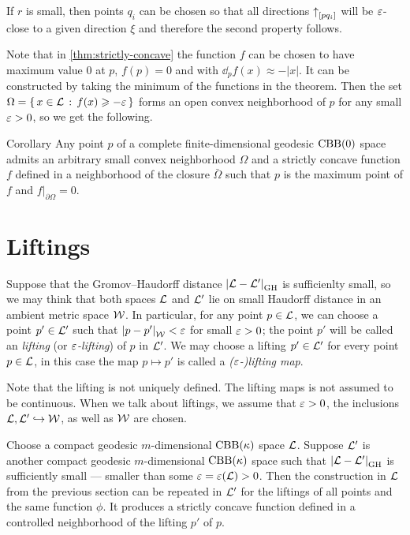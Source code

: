 If $r$ is small, then points $q_i$ can be chosen so that all directions
${\uparrow}_{[{p}{q_i}]}$ will be $\varepsilon$-close to a given direction $\xi$ and
therefore the second property follows.
\qeds

Note that in \ref{thm:strictly-concave} the function $f$ can be chosen to have maximum value $0$ at $p$,
$f(p)=0$ and with $\dd_p f(x)\approx-|x|$.
It can be constructed by taking the minimum of the functions in the theorem.
Then the set $\Omega=\left\{\,{x\in\mathcal{L}}\,:\,{f(x)\geqslant -\varepsilon}\,\right\}$ forms an open convex neighborhood of $p$ for any small $\varepsilon>0$, so we get the following.


\begin{thm}{Corollary}\label{cor:convex-nbhd}
Any point $p$ of a complete finite-dimensional geodesic $\mathrm{CBB}(0)$ space admits an arbitrary small convex neighborhood $\Omega$ and a strictly concave function $f$ defined in a neighborhood of the closure $\bar\Omega$ such that $p$ is the maximum point of $f$
and $f|_{\partial\Omega}=0$.
\end{thm}

\section{Liftings}

Suppose that the Gromov--Haudorff distance $\dist{\spc{L}}{\spc{L}'}{\GH}$ is sufficienlty small, so we may think that both spaces $\mathcal{L}$ and $\mathcal{L}'$ lie on small Haudorff distance in an ambient metric space $\mathcal{W}$.
In particular, for any point $p\in \mathcal{L}$, we can choose a point $p'\in \mathcal{L}'$ such that $\dist{p}{p'}{\spc{W}}<\eps$ for small $\varepsilon>0$;
the point $p'$ will be called an \emph{lifting} (or \emph{$\varepsilon$-lifting}) of $p$ in $\mathcal{L}'$.
We may choose a lifting $p'\in\mathcal{L}'$ for every point $p\in\mathcal{L}$, 
in this case the map $p\mapsto p'$ is called a \emph{($\varepsilon$-)lifting map}.

Note that the lifting is not uniquely defined.
The lifting maps is not assumed to be continuous.
When we talk about liftings, we assume that $\varepsilon>0$, the inclusions $\mathcal{L},\mathcal{L}'\hookrightarrow\mathcal{W}$,
as well as $\mathcal{W}$ are chosen.


Choose a compact geodesic $m$-dimensional $\mathrm{CBB}(\kappa)$ space $\mathcal{L}$.
Suppose $\mathcal{L}'$ is another compact geodesic $m$-dimensional $\mathrm{CBB}(\kappa)$ space such that $\dist{\spc{L}}{\spc{L}'}{\GH}$ is sufficiently small --- smaller than some $\varepsilon=\varepsilon(\mathcal{L})>0$.
Then the construction in $\mathcal{L}$ from the previous section  
can be repeated in $\mathcal{L}'$ for the liftings of all points and the same function $\phi$.
It produces a strictly concave function defined in a controlled neighborhood of the lifting $p'$ of $p$.

